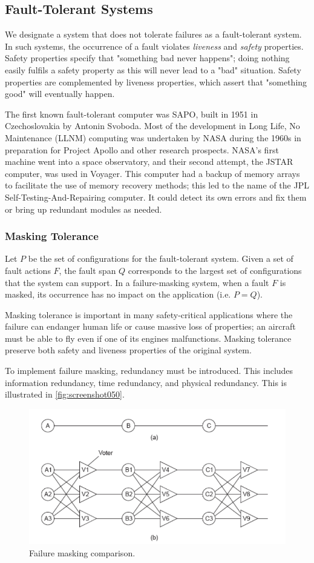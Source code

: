 \subsection{Fault-Tolerant Systems}
We designate a system that does not tolerate failures as a fault-tolerant system. In such systems, the occurrence of a fault violates \textit{liveness} and \textit{safety} properties. Safety properties specify that "something bad never happens"; doing nothing easily fulfils a safety property as this will never lead to a "bad" situation. Safety properties are complemented by liveness properties, which assert that "something good" will eventually happen.

The first known fault-tolerant computer was SAPO, built in 1951 in Czechoslovakia by Antonin Svoboda. Most of the development in Long Life, No Maintenance (LLNM) computing was undertaken by NASA during the 1960s in preparation for Project Apollo and other research prospects. NASA's first machine went into a space observatory, and their second attempt, the JSTAR computer, was used in Voyager. This computer had a backup of memory arrays to facilitate the use of memory recovery methods; this led to the name of the JPL Self-Testing-And-Repairing computer. It could detect its own errors and fix them or bring up redundant modules as needed.

\subsubsection{Masking Tolerance}
Let $P$ be the set of configurations for the fault-tolerant system. Given a set of fault actions $F$, the fault span $Q$ corresponds to the largest set of configurations that the system can support. In a failure-masking system, when a fault $F$ is masked, its occurrence has no impact on the application (i.e. $P = Q$). 

Masking tolerance is important in many safety-critical applications where the failure can endanger human life or cause massive loss of properties; an aircraft must be able to fly even if one of its engines malfunctions. Masking tolerance preserve both safety and liveness properties of the original system. 

To implement failure masking, redundancy must be introduced. This includes information redundancy, time redundancy, and physical redundancy. This is illustrated in \autoref{fig:screenshot050}.
\begin{figure}
\centering
\includegraphics[width=0.7\linewidth]{figures/screenshot050}
\caption{Failure masking comparison.}
\label{fig:screenshot050}
\end{figure}

